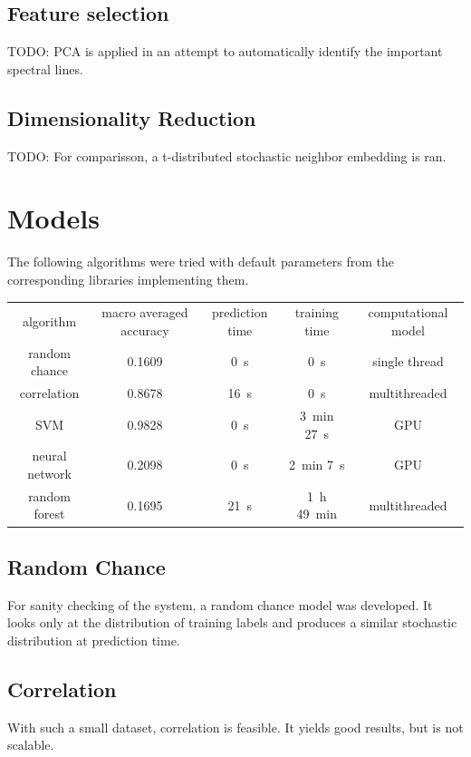 \documentclass{article}
\begin{document}
\subsection{Feature selection}
TODO: PCA is applied in an attempt to automatically identify the important spectral lines.


\subsection{Dimensionality Reduction}
TODO: For comparisson, a t-distributed stochastic neighbor embedding is ran.


\section{Models}
The following algorithms were tried with default parameters from the corresponding libraries implementing them.
\\ \par
{}
\begin{tabular}{ c | c | c | c | c }
algorithm      & macro averaged accuracy & prediction time  & training time                    & computational model \\
random chance  & 0.1609                  & \SI{0}{\second}  & \SI{0}{\second}                  & single thread \\
correlation    & 0.8678                  & \SI{16}{\second} & \SI{0}{\second}                  & multithreaded \\
SVM            & 0.9828                  & \SI{0}{\second}  & \SI{3}{\minute} \SI{27}{\second} & GPU \\
neural network & 0.2098                  & \SI{0}{\second}  & \SI{2}{\minute} \SI{7}{\second}  & GPU \\
random forest  & 0.1695                  & \SI{21}{\second} & \SI{1}{\hour} \SI{49}{\minute}   & multithreaded \\
\end{tabular}


\subsection{Random Chance}
For sanity checking of the system, a random chance model was developed.
It looks only at the distribution of training labels and produces a similar stochastic distribution at prediction time.


\subsection{Correlation}
With such a small dataset, correlation is feasible.
It yields good results, but is not scalable.
\end{document}
